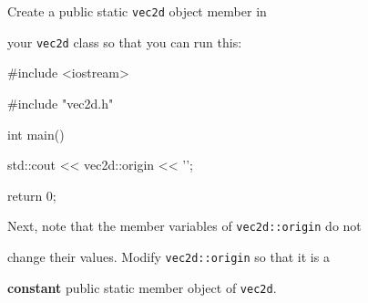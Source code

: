 Create a public static \texttt{vec2d} object member in

your \texttt{vec2d} class so that you can run this:



\begin{consolethree}[escapeinside=||]

#include <iostream>

#include "vec2d.h"



int main()

{

    std::cout << vec2d::origin << '\n';



    return 0;

}

\end{consolethree}



Next, note that the member variables of \texttt{vec2d::origin} do not

change their values. Modify \texttt{vec2d::origin} so that it is a

\textbf{constant} public static member object of \texttt{vec2d}.

